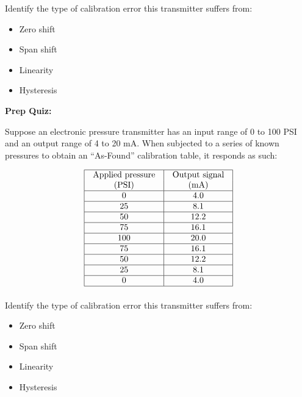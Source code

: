\vskip 10pt

Identify the type of calibration error this transmitter suffers from:

\begin{itemize}
\item{} Zero shift
\vskip 5pt 
\item{} Span shift
\vskip 5pt 
\item{} Linearity
\vskip 5pt 
\item{} Hysteresis
\end{itemize}



\vfil \eject

\noindent
{\bf Prep Quiz:}

Suppose an electronic pressure transmitter has an input range of 0 to 100 PSI and an output range of 4 to 20 mA.  When subjected to a series of known pressures to obtain an ``As-Found'' calibration table, it responds as such:


$$\vbox{\offinterlineskip
\halign{\strut
\vrule \quad\hfil # \ \hfil & 
\vrule \quad\hfil # \ \hfil \vrule \cr
\noalign{\hrule}
%
Applied pressure & Output signal \cr
%
(PSI) & (mA) \cr
%
\noalign{\hrule}
%
0 & 4.0 \cr
%
\noalign{\hrule}
%
25 & 8.1 \cr
%
\noalign{\hrule}
%
50 & 12.2 \cr
%
\noalign{\hrule}
%
75 & 16.1 \cr
%
\noalign{\hrule}
%
100 & 20.0 \cr
%
\noalign{\hrule}
%
75 & 16.1 \cr
%
\noalign{\hrule}
%
50 & 12.2 \cr
%
\noalign{\hrule}
%
25 & 8.1 \cr
%
\noalign{\hrule}
%
0 & 4.0 \cr
%
\noalign{\hrule}
} %
}$$ %

\vskip 10pt

Identify the type of calibration error this transmitter suffers from:

\begin{itemize}
\item{} Zero shift
\vskip 5pt 
\item{} Span shift
\vskip 5pt 
\item{} Linearity
\vskip 5pt 
\item{} Hysteresis
\end{itemize}




\vfil \eject

